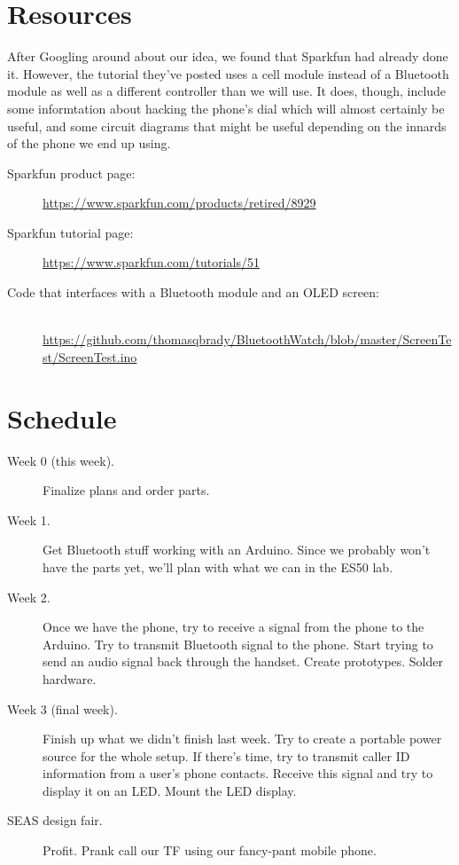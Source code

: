 \documentclass[11pt]{article}
\begin{document}
    \section{Resources}
    After Googling around about our idea, we found that Sparkfun had already done it. However, the tutorial they've posted uses a cell module instead of a Bluetooth module as well as a different controller than we will use. It does, though, include some informtation about hacking the phone's dial which will almost certainly be useful, and some circuit diagrams that might be useful depending on the innards of the phone we end up using.

    \begin{description}
        \item[Sparkfun product page:] \url{https://www.sparkfun.com/products/retired/8929}
        \item[Sparkfun tutorial page:] \url{https://www.sparkfun.com/tutorials/51}
        \item[Code that interfaces with a Bluetooth module and an OLED screen:]\mbox{}\\
        \url{https://github.com/thomasqbrady/BluetoothWatch/blob/master/ScreenTest/ScreenTest.ino}
    \end{description}


    \section{Schedule}
        \begin{description}
            \item[Week 0 (this week).] Finalize plans and order parts.
            \item[Week 1.] Get Bluetooth stuff working with an Arduino. Since we probably won't have the parts yet, we'll plan with what we can in the ES50 lab.
            \item[Week 2.] Once we have the phone, try to receive a signal from the phone to the Arduino. Try to transmit Bluetooth signal to the phone. Start trying to send an audio signal back through the handset. Create prototypes. Solder hardware.
            \item[Week 3 (final week).] Finish up what we didn't finish last week. Try to create a portable power source for the whole setup. If there's time, try to transmit caller ID information from a user's phone contacts. Receive this signal and try to display it on an LED. Mount the LED display.
            \item[SEAS design fair.] Profit. Prank call our TF using our fancy-pant mobile phone.
        \end{description}
\end{document}
